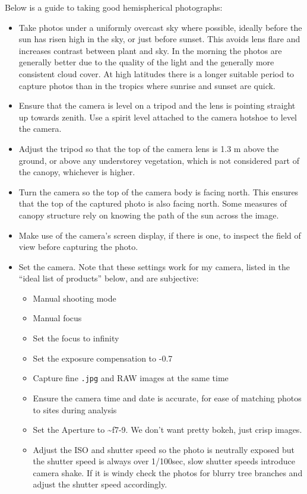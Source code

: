 \documentclass[11pt,a4paper]{article}
\newcommand\file[1]{\texttt{\color{file}#1}}  %
\begin{document}
Below is a guide to taking good hemispherical photographs: 

\begin{itemize}
	\item{Take photos under a uniformly overcast sky where possible, ideally before the sun has risen high in the sky, or just before sunset. This avoids lens flare and increases contrast between plant and sky. In the morning the photos are generally better due to the quality of the light and the generally more consistent cloud cover. At high latitudes there is a longer suitable period to capture photos than in the tropics where sunrise and sunset are quick.}
	\item{Ensure that the camera is level on a tripod and the lens is pointing straight up towards zenith. Use a spirit level attached to the camera hotshoe to level the camera.}
	\item{Adjust the tripod so that the top of the camera lens is 1.3 m above the ground, or above any understorey vegetation, which is not considered part of the canopy, whichever is higher.} 
	\item{Turn the camera so the top of the camera body is facing north. This ensures that the top of the captured photo is also facing north. Some measures of canopy structure rely on knowing the path of the sun across the image.}
	\item{Make use of the camera's screen display, if there is one, to inspect the field of view before capturing the photo.}
	\item{Set the camera. Note that these settings work for my camera, listed in the  
		``ideal list of products'' below, and are subjective:}
		\begin{itemize}
			\item{Manual shooting mode}
			\item{Manual focus}
			\item{Set the focus to infinity}
			\item{Set the exposure compensation to -0.7 \citep{Zhang2005}}
			\item{Capture fine \file{.jpg} and RAW images at the same time}
			\item{Ensure the camera time and date is accurate, for ease of matching photos to sites during analysis}
			\item{Set the Aperture to \textasciitilde{}f7-9. We don't want pretty bokeh, just crisp images.}
			\item{Adjust the ISO and shutter speed so the photo is neutrally exposed but the shutter speed is always over 1/100sec, slow shutter speeds introduce camera shake. If it is windy check the photos for blurry tree branches and adjust the shutter speed accordingly.}

\end{itemize}
\end{itemize}
\end{document}

